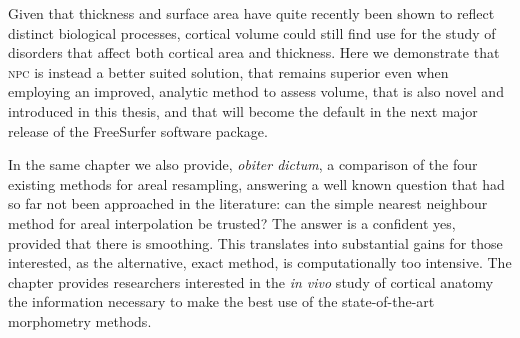 Given that thickness and surface area have quite recently been shown to reflect distinct biological processes, cortical volume could still find use for the study of disorders that affect both cortical area and thickness. Here we demonstrate that \textsc{npc} is instead a better suited solution, that remains superior even when employing an improved, analytic method to assess volume, that is also novel and introduced in this thesis, and that will become the default in the next major release of the FreeSurfer software package.

In the same chapter we also provide, \emph{obiter dictum}, a comparison of the four existing methods for areal resampling, answering a well known question that had so far not been approached in the literature: can the simple nearest neighbour method for areal interpolation be trusted? The answer is a confident yes, provided that there is smoothing. This translates into substantial gains for those interested, as the alternative, exact method, is computationally too intensive. The chapter provides researchers interested in the \emph{in vivo} study of cortical anatomy the information necessary to make the best use of the state-of-the-art morphometry methods.